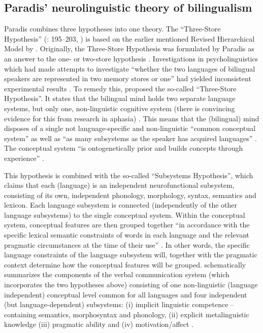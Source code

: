 \subsection{Paradis’ neurolinguistic theory of bilingualism}
\label{sec:5.3.1}  
Paradis combines three hypotheses into one theory. The “Three-Store Hypothesis” (\citeyear{paradis_bilingual_1978, paradis_language_1980, paradis_neurolinguistic_2004}: 195–203, \citeyear[3-28]{kecskes_neurofunctional_2007}) is based on the earlier mentioned Revised Hierarchical Model by \citet{kroll_category_1994}. Originally, the Three-Store Hypothesis was formulated by Paradis as an answer to the one- or two-store hypothesis \citep{kolers_bilingualism_1968,hornby_bilingual_1977}. Investigations in psycholinguistics which had made attempts to investigate “whether the two languages of bilingual speakers are represented in two memory stores or one” had yielded inconsistent experimental results \citep[6]{kecskes_neurofunctional_2007}. To remedy this, \citet{paradis_bilingual_1978, paradis_language_1980} proposed the so-called “Three-Store Hypothesis”. It states that the bilingual mind holds two separate language systems, but only one, non-linguistic cognitive system (there is convincing evidence for this from research in aphasia) \citep[196]{paradis_neurolinguistic_2004}. This means that the (bilingual) mind disposes of a single not language-specific and non-linguistic “common conceptual system” as well as “as many subsystems as the speaker has acquired languages” \citep[3]{kecskes_neurofunctional_2007}. The conceptual system “is ontogenetically prior and builds concepts through experience” \citep[198]{paradis_neurolinguistic_2004}.

This hypothesis is combined with the so-called “Subsystems Hypothesis”, which claims that each (language) is an independent neurofunctional subsystem, consisting of its own, independent phonology, morphology, syntax, semantics and lexicon. Each language subsystem is connected (independently of the other language subsystems) to the single conceptual system. Within the conceptual system, conceptual features are then grouped together “in accordance with the specific lexical semantic constraints of words in each language and the relevant pragmatic circumstances at the time of their use” \citep[3]{kecskes_neurofunctional_2007}. In other words, the specific language constraints of the language subsystem will, together with the pragmatic context determine how the conceptual features will be grouped.  schematically summarizes the components of the verbal communication system (which incorporates the two hypotheses above) consisting of one non-linguistic (language independent) conceptual level common for all languages and four independent (but language-dependent) subsystems: (i) implicit linguistic competence – containing semantics, morphosyntax and phonology, (ii) explicit metalinguistic knowledge (iii) pragmatic ability and (iv) motivation/affect \citep[3]{paradis_neurolinguistic_2004, kecskes_neurofunctional_2007}.


